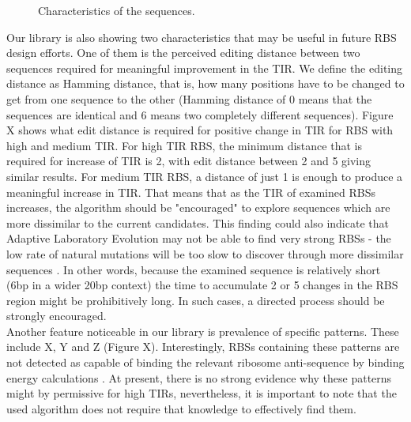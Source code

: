 \documentclass{article}
\begin{document}
\begin{figure}[t]
\begin{minipage}{.5\linewidth}
\centering
{}
\end{minipage}
\caption{Characteristics of the sequences.}
\label{fig:characteristics}
\end{figure}

Our library is also showing two characteristics that may be useful in future RBS design efforts.
One of them is the perceived editing distance between two sequences required for meaningful improvement in the TIR. 
We define the editing distance as Hamming distance, that is, how many positions have to be changed to get from one sequence to the other (Hamming distance of 0 means that the sequences are identical and 6 means two completely different sequences).
Figure X shows what edit distance is required for positive change in TIR for RBS with high and medium TIR.
For high TIR RBS, the minimum distance that is required for increase of TIR is 2, with edit distance between 2 and 5 giving similar results.
For medium TIR RBS, a distance of just 1 is enough to produce a meaningful increase in TIR.
That means that as the TIR of examined RBSs increases, the algorithm should be "encouraged" to explore sequences which are more dissimilar to the current candidates.
This finding could also indicate that Adaptive Laboratory Evolution may not be able to find very strong RBSs - the low rate of natural mutations will be too slow to discover through more dissimilar sequences \cite{Lee2012}.
In other words, because the examined sequence is relatively short (6bp in a wider 20bp context) the time to accumulate 2 or 5 changes in the RBS region might be prohibitively long.
In such cases, a directed process should be strongly encouraged.\\
Another feature noticeable in our library is prevalence of specific patterns.
These include X, Y and Z (Figure X). 
Interestingly, RBSs containing these patterns are not detected as capable of binding the relevant ribosome anti-sequence by binding energy calculations \cite{Mann2017}.
At present, there is no strong evidence why these patterns might by permissive for high TIRs, nevertheless, it is important to note that the used algorithm does not require that knowledge to effectively find them.\\
\end{document}
